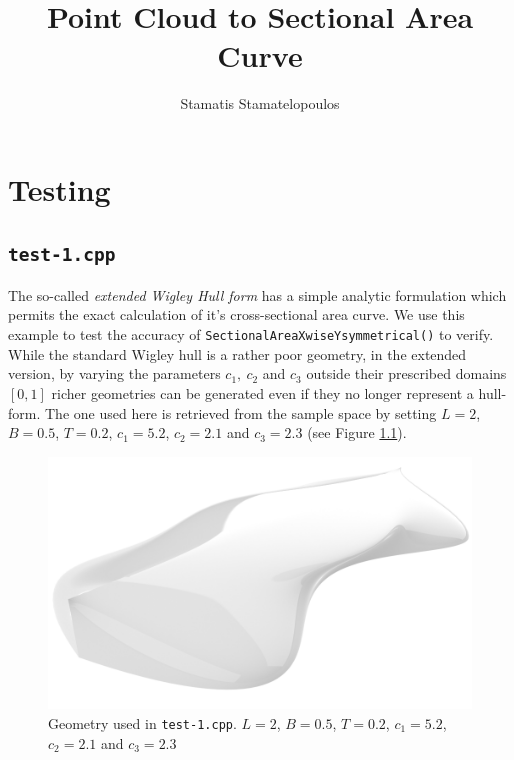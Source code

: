 \documentclass{report}
\title{Point Cloud to Sectional Area Curve}
\author{Stamatis Stamatelopoulos}
\begin{document}
\maketitle
 
\tableofcontents

\chapter{Testing}

\section{\texttt{test-1.cpp}}

\newpar The so-called {\it extended Wigley Hull form} \parencite{journee1992experiments} has a 
simple analytic formulation which permits the exact calculation
of it's cross-sectional area curve. We use this example to test 
the accuracy of \texttt{SectionalAreaXwiseYsymmetrical()} to verify. While the standard
Wigley hull is a rather poor geometry, in the extended version, 
by varying the parameters $c_1,\ c_2$ and $c_3$ outside their
prescribed domains $[0,1]$ richer geometries can be generated
even if they no longer represent a hull-form. The one used here is 
retrieved from the sample space by setting $L = 2$, $B=0.5$, $T = 0.2$, 
$c_1 = 5.2$, $c_2 = 2.1$ and $c_3 = 2.3$ (see Figure \ref{fig:test-1-wigley-render}).
\begin{figure}[H]
    \centering
    \includegraphics[width=1.0\linewidth]{figures/test-1-wigley-render.png}
    \caption{Geometry used in \texttt{test-1.cpp}. $L = 2$, $B=0.5$, $T = 0.2$, 
    $c_1 = 5.2$, $c_2 = 2.1$ and $c_3 = 2.3$}
    \label{fig:test-1-wigley-render}
\end{figure}
\end{document}
